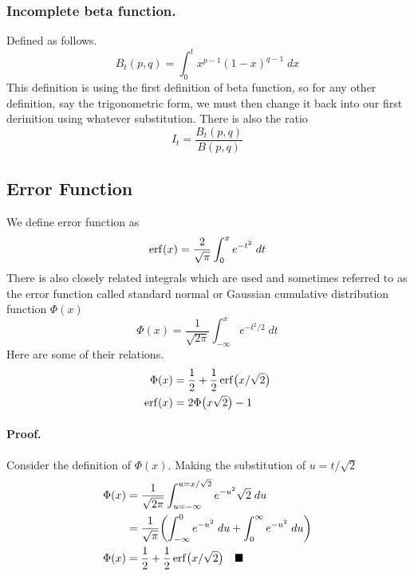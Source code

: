 \documentclass[../../main.tex]{subfiles}
\begin{document}
\subsubsection*{Incomplete beta function.} Defined as follows.
\begin{equation*}
    B_t(p,q)=\int_{0}^{t}x^{p-1}(1-x)^{q-1}\;dx
\end{equation*}
This definition is using the first definition of beta function, so for any other definition, say the trigonometric form, we must then change it back into our first derinition using whatever substitution. There is also the ratio
\begin{equation*}
    I_t=\frac{B_t(p,q)}{B(p,q)}
\end{equation*}

\subsection*{Error Function} We define error function as 
\begin{equation*}
    \operatorname{erf}(x)=\frac{2}{\sqrt{\pi}}\int_{0}^{x}e^{-t^2}\;dt
\end{equation*}
There is also closely related integrals which are used and sometimes referred to as the error function called standard normal or Gaussian cumulative distribution function $\Phi(x)$
\begin{equation*}
    \Phi(x)=\frac{1}{\sqrt{2\pi}}\int_{-\infty}^{x} e^{-t^2/2}\;dt
\end{equation*}
Here are some of their relations.
\begin{align*}
    \Phi(x)&=\frac{1}{2}+\frac{1}{2}\operatorname{erf}\bigl(x/\sqrt{2}\bigr)\\
    \operatorname{erf}(x)&=2\Phi\bigl(x\sqrt{2}\bigr)-1
\end{align*}

\paragraph{Proof.} Consider the definition of $\Phi(x)$. Making the substitution of $u=t/\sqrt{2}$
\begin{align*}
    \Phi(x)&=\frac{1}{\sqrt{2\pi}}\int_{u=-\infty}^{u=x/\sqrt{2}}e^{-u^2}\sqrt{2}\;du\\
    &=\frac{1}{\sqrt{\pi}} \biggl(\int_{-\infty}^{0}e^{-u^2}\;du+ \int_{0}^{\infty}e^{-u^2}\;du\biggr)\\
    \Phi(x)&=\frac{1}{2}+\frac{1}{2}\operatorname{erf}\bigl(x/\sqrt{2}\bigr)\quad\blacksquare
\end{align*}
\end{document}
